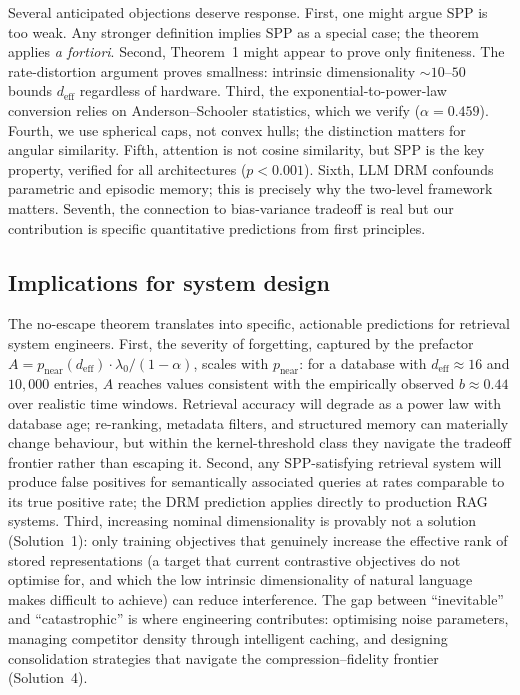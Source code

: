 \documentclass[11pt]{article}
\begin{document}
Several anticipated objections deserve response. First, one might argue SPP is too weak. Any stronger definition implies SPP as a special case; the theorem applies \textit{a fortiori}. Second, Theorem~1 might appear to prove only finiteness. The rate-distortion argument\cite{shannon1959,amari2000} proves smallness: intrinsic dimensionality ${\sim}10$--$50$\cite{levina2005} bounds $d_\text{eff}$ regardless of hardware. Third, the exponential-to-power-law conversion relies on Anderson--Schooler statistics, which we verify ($\alpha = 0.459$). Fourth, we use spherical caps, not convex hulls; the distinction matters for angular similarity. Fifth, attention is not cosine similarity, but SPP is the key property, verified for all architectures ($p < 0.001$). Sixth, LLM DRM confounds parametric and episodic memory; this is precisely why the two-level framework matters. Seventh, the connection to bias-variance tradeoff is real but our contribution is specific quantitative predictions from first principles.

\subsection*{Implications for system design}
\noindent The no-escape theorem translates into specific, actionable predictions for retrieval system engineers. First, the severity of forgetting, captured by the prefactor $A = p_\text{near}(d_\text{eff}) \cdot \lambda_0 / (1-\alpha)$, scales with $p_\text{near}$: for a database with $d_\text{eff} \approx 16$ and $10{,}000$ entries, $A$ reaches values consistent with the empirically observed $b \approx 0.44$ over realistic time windows. Retrieval accuracy will degrade as a power law with database age; re-ranking, metadata filters, and structured memory can materially change behaviour, but within the kernel-threshold class they navigate the tradeoff frontier rather than escaping it. Second, any SPP-satisfying retrieval system will produce false positives for semantically associated queries at rates comparable to its true positive rate; the DRM prediction applies directly to production RAG systems. Third, increasing nominal dimensionality is provably not a solution (Solution~1): only training objectives that genuinely increase the effective rank of stored representations (a target that current contrastive objectives do not optimise for, and which the low intrinsic dimensionality of natural language makes difficult to achieve) can reduce interference. The gap between ``inevitable'' and ``catastrophic'' is where engineering contributes: optimising noise parameters, managing competitor density through intelligent caching, and designing consolidation strategies that navigate the compression--fidelity frontier (Solution~4).
\end{document}
